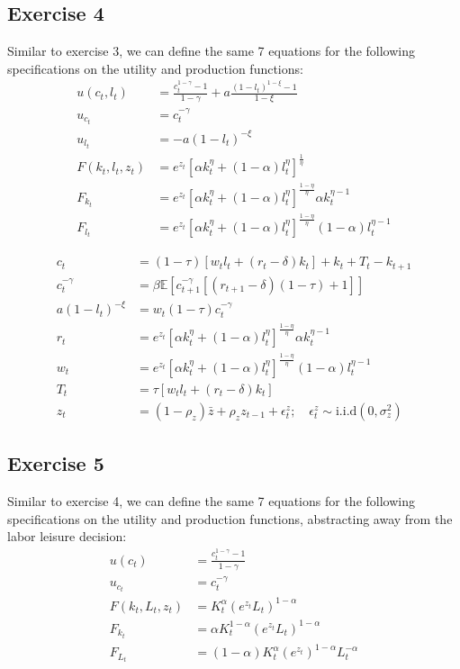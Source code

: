 \documentclass{article}
\begin{document}
	\subsection*{Exercise 4}
	Similar to exercise 3, we can define the same 7 equations for the following specifications on the utility and production functions:
	\begin{align*}
	u(c_t, l_t) &= \frac{c_t^{1 - \gamma} - 1}{1 - \gamma} + a \frac{(1-l_t)^{1-\xi} -1}{1 -\xi} \\
	u_{c_t} &= c_t^{-\gamma} \\
	u_{l_t} &= -a(1-l_t)^{-\xi} \\
	F(k_t, l_t, z_t) &= e^{z_t} [\alpha k_t^{\eta} + (1-\alpha) l_t^{\eta}]^{\frac{1}{\eta}} \\
	F_{k_t} &= e^{z_t} [\alpha k_t^{\eta} + (1-\alpha) l_t^{\eta}]^{\frac{1-\eta}{\eta}} \alpha k_t^{\eta -1} \\
	F_{l_t} &= e^{z_t} [\alpha k_t^{\eta} + (1-\alpha) l_t^{\eta}]^{\frac{1-\eta}{\eta}} (1-\alpha) l_t^{\eta-1}
	\end{align*}
	
	\begin{align*}
	c_t &= (1 -\tau)[w_t l_t + (r_t - \delta)k_t] + k_t + T_t - k_{t+1} \\
	c_t^{-\gamma} &= \beta \mathbb{E}\left[c_{t+1}^{-\gamma}[(r_{t+1} - \delta)(1 -\tau) + 1] \right] \\
	a(1-l_t)^{-\xi} &= w_t (1-\tau)c_t^{-\gamma} \\
	r_t &= e^{z_t} [\alpha k_t^{\eta} + (1-\alpha) l_t^{\eta}]^{\frac{1-\eta}{\eta}} \alpha k_t^{\eta -1} \\
	w_t &= e^{z_t} [\alpha k_t^{\eta} + (1-\alpha) l_t^{\eta}]^{\frac{1-\eta}{\eta}} (1-\alpha) l_t^{\eta-1} \\
	T_t &= \tau[w_t l_t + (r_t - \delta) k_t] \\
	z_t &= (1 - \rho_z)\bar{z} + \rho_z z_{t-1} + \epsilon^z_t; \quad \epsilon_t^z \sim \text{i.i.d}(0, \sigma_z^2)
	\end{align*}	
	
	\subsection*{Exercise 5}
	Similar to exercise 4, we can define the same 7 equations for the following specifications on the utility and production functions, abstracting away from the labor leisure decision:
	\begin{align*}
	u(c_t) &= \frac{c_t^{1 - \gamma} - 1}{1 - \gamma}  \\
	u_{c_t} &= c_t^{-\gamma} \\
	F(k_t, L_t, z_t) &= K_t^{\alpha} (e^{z_t}L_t)^{1-\alpha} \\
	F_{k_t} &= \alpha K_t^{1-\alpha} (e^{z_t}L_t)^{1-\alpha} \\
	F_{L_t} &= (1-\alpha) K_t^{\alpha} (e^{z_t})^{1-\alpha} L_t^{-\alpha} 
	\end{align*}	
		
\end{document}
